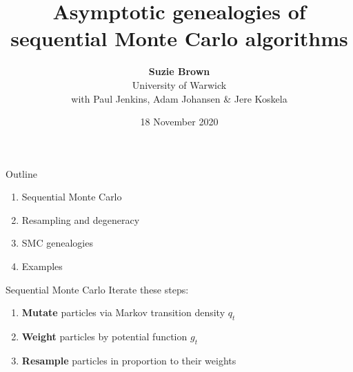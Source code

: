 \documentclass[aspectratio=169]{beamer}
\title[Genealogies of SMC Algorithms]{Asymptotic genealogies of sequential Monte Carlo algorithms}
\author[Suzie Brown]{\textbf{Suzie Brown} \\ University of Warwick \\ with Paul Jenkins, Adam Johansen \& Jere Koskela}
\date{18 November 2020}
\theoremstyle{definition}
\begin{document}
\begin{frame}
\maketitle
\end{frame}

\begin{frame}{Outline}
\begin{enumerate}
\item Sequential Monte Carlo
\item Resampling and degeneracy
\item SMC genealogies
\item Examples
\end{enumerate}
\end{frame}


\begin{frame}{Sequential Monte Carlo}
Iterate these steps:
\begin{enumerate}
\item \textbf{Mutate} particles via Markov transition density $q_t$
\item \textbf{Weight} particles by potential function $g_t$
\item \textbf{Resample} particles in proportion to their weights
\end{enumerate}
\end{frame}
\end{document}
